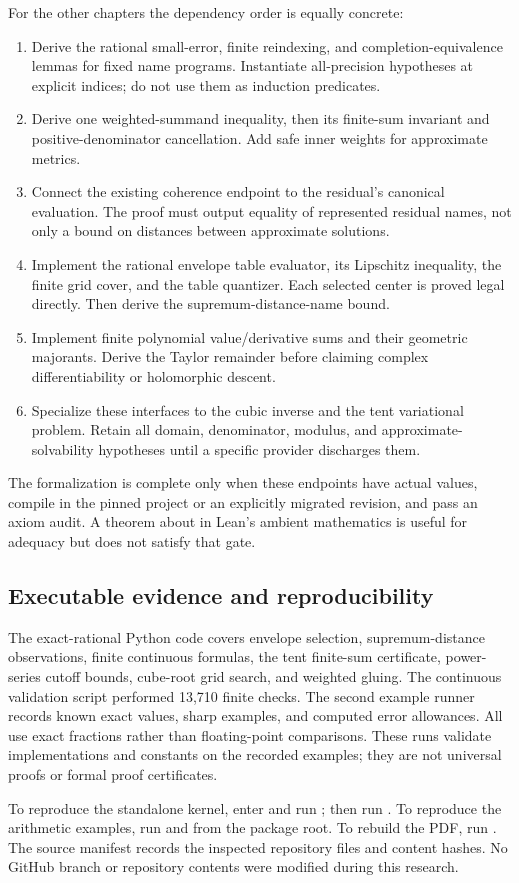 For the other chapters the dependency order is equally concrete:
\begin{enumerate}
\item Derive the rational small-error, finite reindexing, and completion-equivalence lemmas for fixed name programs. Instantiate all-precision hypotheses at explicit indices; do not use them as induction predicates.
\item Derive one weighted-summand inequality, then its finite-sum invariant and positive-denominator cancellation. Add safe inner weights for approximate metrics.
\item Connect the existing coherence endpoint to the residual's canonical evaluation. The proof must output equality of represented residual names, not only a bound on distances between approximate solutions.
\item Implement the rational envelope table evaluator, its Lipschitz inequality, the finite grid cover, and the table quantizer. Each selected center is proved legal directly. Then derive the supremum-distance-name bound.
\item Implement finite polynomial value/derivative sums and their geometric majorants. Derive the Taylor remainder before claiming complex differentiability or holomorphic descent.
\item Specialize these interfaces to the cubic inverse and the tent variational problem. Retain all domain, denominator, modulus, and approximate-solvability hypotheses until a specific provider discharges them.
\end{enumerate}

The formalization is complete only when these endpoints have actual  values, compile in the pinned project or an explicitly migrated revision, and pass an axiom audit. A theorem about  in Lean's ambient mathematics is useful for adequacy but does not satisfy that gate.

\subsection{Executable evidence and reproducibility}

The exact-rational Python code covers envelope selection, supremum-distance observations, finite continuous formulas, the tent finite-sum certificate, power-series cutoff bounds, cube-root grid search, and weighted gluing. The continuous validation script performed 13,710 finite checks. The second example runner records known exact values, sharp examples, and computed error allowances. All use exact fractions rather than floating-point comparisons. These runs validate implementations and constants on the recorded examples; they are not universal proofs or formal proof certificates.

To reproduce the standalone kernel, enter  and run ; then run . To reproduce the arithmetic examples, run  and  from the package root. To rebuild the PDF, run . The source manifest records the inspected repository files and content hashes. No GitHub branch or repository contents were modified during this research.
